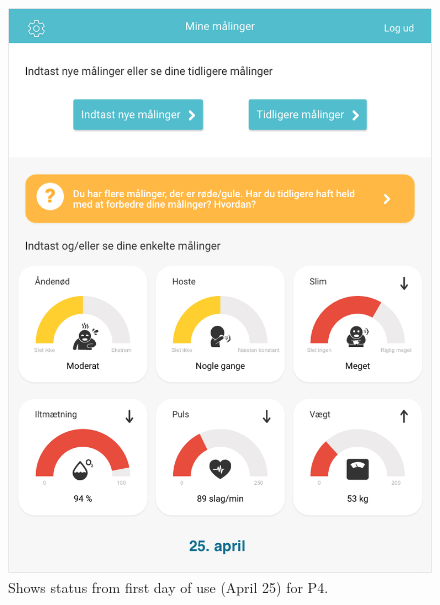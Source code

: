 \begin{figure}[h]
  \centering
  \begin{minipage}[b]{0.45\textwidth}
    \includegraphics[width=\textwidth]{images/study3/Gunnar12.png}
    \caption{Shows status from first day of use (April 25) for P4.}
    \label{fig:gunnar12}
  \end{minipage}
  \hfill
  \begin{minipage}[b]{0.45\textwidth}

\end{minipage}
\end{figure}
